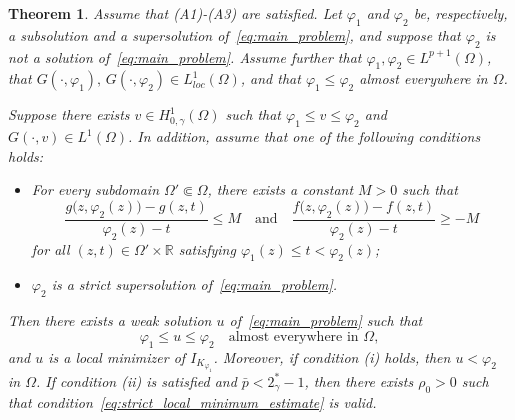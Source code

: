 \documentclass[11pt]{article}
\newtheorem{theorem}{Theorem}[section] %
\newcommand{\om} {\Omega}
\newcommand{\spacegr}{H^{1}_{0,\gamma}(\Omega)}
\begin{document}
\begin{theorem}
\label{thm:existence_between_sub_super}
Assume that \textnormal{(A1)}-\textnormal{(A3)} are satisfied. Let $\varphi_1$ and $\varphi_2$ be, respectively, a subsolution and a supersolution of~\eqref{eq:main_problem}, and suppose that $\varphi_2$ is not a solution of~\eqref{eq:main_problem}. Assume further that $\varphi_1,\varphi_2 \in L^{p+1}(\Omega)$, that $G(\cdot,\varphi_1),\,G(\cdot,\varphi_2)\in L_{loc}^{1}(\Omega)$, and that $\varphi_1 \leq \varphi_2$ almost everywhere in $\Omega$. 

Suppose there exists $v \in \spacegr$ such that $\varphi_1 \leq v \leq \varphi_2$ and $G(\cdot,v)\in L^{1}(\Omega)$. In addition, assume that one of the following conditions holds:
\begin{itemize}
    \item[(i)] For every subdomain $\Omega' \Subset \Omega$, there exists a constant $M>0$ such that
    \begin{equation*}
    \frac{g\bigl(z,\varphi_2(z)\bigr)-g(z,t)}{\varphi_2(z)-t}\leq M
    \quad \text{and} \quad
    \frac{f\bigl(z,\varphi_2(z)\bigr)-f(z,t)}{\varphi_2(z)-t}\geq -M
    \end{equation*}
    for all $(z,t)\in \Omega'\times\mathbb{R}$ satisfying $\varphi_1(z)\leq t<\varphi_2(z)$;
    
    \item[(ii)] $\varphi_2$ is a strict supersolution of~\eqref{eq:main_problem}.
\end{itemize}

Then there exists a weak solution $u$ of~\eqref{eq:main_problem} such that
\[
\varphi_1 \leq u \leq \varphi_2
\quad \text{almost everywhere in } \Omega,
\]
and $u$ is a local minimizer of $I_{K_{\varphi_1}}$. Moreover, if condition \textnormal{(i)} holds, then $u < \varphi_2$ in $\om$. If condition \textnormal{(ii)} is satisfied and $\bar p < 2_{\gamma}^{\ast}-1$, then there exists $\rho_0>0$ such that condition~\eqref{eq:strict_local_minimum_estimate} is valid.
\end{theorem}
\end{document}

